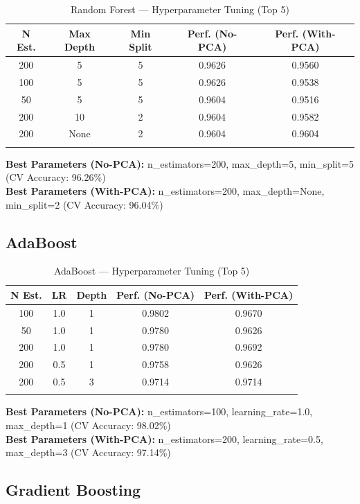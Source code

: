 \documentclass[12pt,a4paper]{article}
\begin{document}
\begin{longtable}{|c|c|c|c|c|}
\hline
\textbf{N Est.} & \textbf{Max Depth} & \textbf{Min Split} & \textbf{Perf. (No-PCA)} & \textbf{Perf. (With-PCA)} \\ \hline
\endhead
200 & 5 & 5 & 0.9626 & 0.9560 \\ \hline
100 & 5 & 5 & 0.9626 & 0.9538 \\ \hline
50 & 5 & 5 & 0.9604 & 0.9516 \\ \hline
200 & 10 & 2 & 0.9604 & 0.9582 \\ \hline
200 & None & 2 & 0.9604 & 0.9604 \\ \hline
\caption{Random Forest — Hyperparameter Tuning (Top 5)}
\label{tab:rf_tuning}
\end{longtable}

\textbf{Best Parameters (No-PCA):} n\_estimators=200, max\_depth=5, min\_split=5 (CV Accuracy: 96.26\%)\\
\textbf{Best Parameters (With-PCA):} n\_estimators=200, max\_depth=None, min\_split=2 (CV Accuracy: 96.04\%)

\subsection{AdaBoost}

\begin{longtable}{|c|c|c|c|c|}
\hline
\textbf{N Est.} & \textbf{LR} & \textbf{Depth} & \textbf{Perf. (No-PCA)} & \textbf{Perf. (With-PCA)} \\ \hline
\endhead
100 & 1.0 & 1 & 0.9802 & 0.9670 \\ \hline
50 & 1.0 & 1 & 0.9780 & 0.9626 \\ \hline
200 & 1.0 & 1 & 0.9780 & 0.9692 \\ \hline
200 & 0.5 & 1 & 0.9758 & 0.9626 \\ \hline
200 & 0.5 & 3 & 0.9714 & 0.9714 \\ \hline
\caption{AdaBoost — Hyperparameter Tuning (Top 5)}
\label{tab:ada_tuning}
\end{longtable}

\textbf{Best Parameters (No-PCA):} n\_estimators=100, learning\_rate=1.0, max\_depth=1 (CV Accuracy: 98.02\%)\\
\textbf{Best Parameters (With-PCA):} n\_estimators=200, learning\_rate=0.5, max\_depth=3 (CV Accuracy: 97.14\%)

\subsection{Gradient Boosting}
\end{document}
